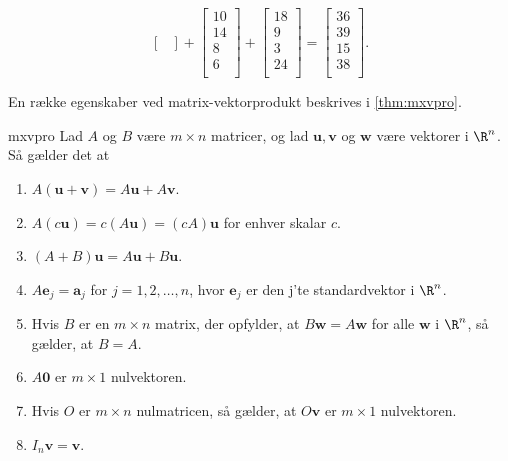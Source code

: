 \begin{eks}
$$\begin{bmatrix}
\end{bmatrix}
+
\begin{bmatrix}
10\\
14\\
8\\
6\\
\end{bmatrix}
+
\begin{bmatrix}
18\\
9\\
3\\
24\\
\end{bmatrix}
=
\begin{bmatrix}
36\\
39\\
15\\
38\\
\end{bmatrix}.
$$
\end{eks}
% 
En række egenskaber ved matrix-vektorprodukt beskrives i \ref{thm:mxvpro}.
%
\begin{thm}{}{mxvpro}
Lad $A$ og $B$ være $m \times n$ matricer, og lad $\mathbf{u}, \mathbf{v}$ og $\mathbf{w}$ være vektorer i $\R^n$. Så gælder det at
\begin{enumerate}[label=(\alph*)]
\item $A(\mathbf{u}+\mathbf{v})=A\mathbf{u}+A\mathbf{v}$.
\item $A(c\mathbf{u})=c(A\mathbf{u})=(cA)\mathbf{u}$ for enhver skalar $c$.
\item $(A+B)\mathbf{u}=A\mathbf{u}+B\mathbf{u}$.
\item $A\mathbf{e}_j=\mathbf{a}_j$ for $j=1,2,\ldots,n$, hvor $\mathbf{e}_j$ er den j'te standardvektor i $\R^n$.
\item Hvis $B$ er en $m \times n$ matrix, der opfylder, at $B\mathbf{w}=A\mathbf{w}$ for alle $\mathbf{w}$ i $\R^n$, så gælder, at $B=A$.
\item $A\mathbf{0}$ er $m \times 1$ nulvektoren.
\item Hvis $O$ er $m \times n$ nulmatricen, så gælder, at $O\mathbf{v}$ er $m \times 1$ nulvektoren.
\item $I_n\mathbf{v}=\mathbf{v}$.
\end{enumerate}
\end{thm}
%
